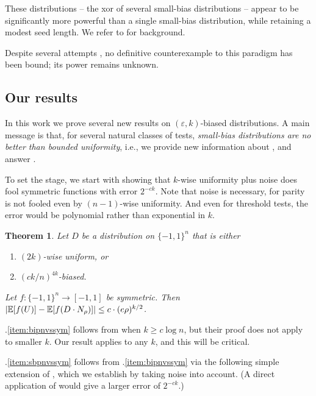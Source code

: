 \documentclass[10pt,a4paper]{article}
\newtheorem{theorem}{Theorem}%
\theoremstyle{definition}
\newcommand{\E}{\mathop{\mathbb{E}\/}}
\newcommand{\pmo}{\{-1,1\}}
\DeclarePairedDelimiter\abs{\lvert}{\rvert}
\def\epsilon{\varepsilon}
\newcommand{\e}{\epsilon}
\begin{document}
These distributions -- the xor of several small-bias distributions -- appear to
be significantly more powerful than a single small-bias distribution, while retaining
a modest seed length.  We refer to
\cite{ODonnell14, corr-survey, DBLP:journals/eccc/HatamiH23, moti} for background.

Despite several attempts \cite{BDVY08,MZ09,LV-sum}, no definitive counterexample to this paradigm has been bound; its power remains unknown.

\subsection{Our results}

In this work we prove several new results on $(\e,k)$-biased distributions.  A main message is that, for several natural classes of tests, \emph{small-bias distributions are no better than bounded uniformity}, i.e., we provide new information about , and answer .

To set the stage, we start with showing that $k$-wise uniformity plus noise does fool symmetric functions with error $2^{-ck}$.  Note that noise is necessary, for parity is not fooled even by $(n-1)$-wise uniformity.  And even for threshold tests, the error would be polynomial \cite{DGJSV-bifh,benjamini2012kwise} rather than exponential in $k$.


\begin{theorem} \label{thm:bipnvssym}
Let $D$ be a distribution on $\pmo^n$ that is either
\begin{enumerate}[label=(\roman*),itemsep=2pt,parsep=0pt,topsep=2pt]
  \item \label{item:bipnvssym} $(2k)$-wise uniform, or
  \item \label{item:sbpnvssym} $(ck/n)^{4k}$-biased.
\end{enumerate}
Let $f\colon\pmo^n \to [-1,1]$ be symmetric.  Then $\abs{\E[f(U)] - \E[f(D \cdot N_\rho)] } \le c \cdot (e\rho)^{k/2}$.
\end{theorem}


.\ref{item:bipnvssym} follows from \cite{ForbesKelley-2018} when $k\ge c\log n$, but their proof does not apply to smaller $k$.  Our result applies to any $k$, and this will be critical.

.\ref{item:sbpnvssym} follows from .\ref{item:bipnvssym} via the following simple extension of , which we establish by taking noise into account.  (A direct application of  would give a larger error of $2^{-ck}$.)
\end{document}
